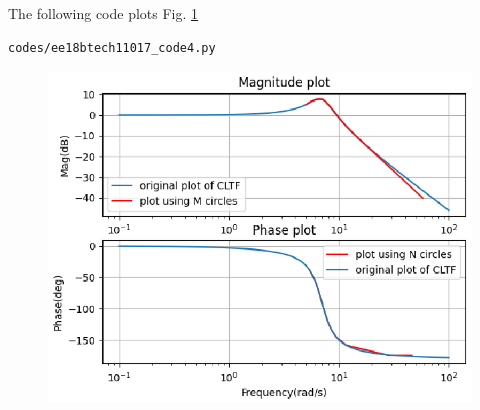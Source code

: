 The following code plots Fig. \ref{fig:ee18btech11017_fig3}
\begin{lstlisting}
codes/ee18btech11017_code4.py
\end{lstlisting}

\begin{figure}[!h]
  \includegraphics[width=\columnwidth]{./figs/ee18btech11017_fig3.eps}
 \caption{}
  \label{fig:ee18btech11017_fig3}
\end{figure}














